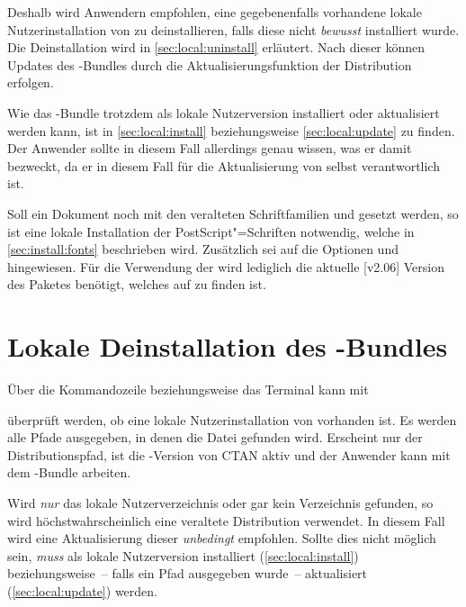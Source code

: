 Deshalb wird Anwendern empfohlen, eine gegebenenfalls vorhandene lokale 
Nutzerinstallation von \TUDScript zu deinstallieren, falls diese nicht 
\emph{bewusst} installiert wurde. Die Deinstallation wird in 
\autoref{sec:local:uninstall} erläutert. Nach dieser können Updates des 
\TUDScript-Bundles durch die Aktualisierungsfunktion der Distribution erfolgen. 

Wie das \TUDScript-Bundle trotzdem als lokale Nutzerversion installiert oder 
aktualisiert werden kann, ist in \autoref{sec:local:install} beziehungsweise 
\autoref{sec:local:update} zu finden. Der Anwender sollte in diesem Fall 
allerdings genau wissen, was er damit bezweckt, da er in diesem Fall für die 
Aktualisierung von \TUDScript selbst verantwortlich ist.

Soll ein Dokument noch mit den veralteten Schriftfamilien \Univers und \DIN 
gesetzt werden, so ist eine lokale Installation der PostScript"=Schriften 
notwendig, welche in \autoref{sec:install:fonts} beschrieben wird. Zusätzlich 
sei auf die Optionen  und  
hingewiesen. Für die Verwendung der \OpenSans wird lediglich die aktuelle 
[v2.06]  
Version des Paketes  benötigt, welches auf 
 zu finden ist.


\section{Lokale Deinstallation des \TUDScript-Bundles}
%
%
%
Über die Kommandozeile beziehungsweise das Terminal kann mit
%
\begin{quoting}
\end{quoting}
%
überprüft werden, ob eine lokale Nutzerinstallation von \TUDScript vorhanden 
ist. Es werden alle Pfade ausgegeben, in denen die Datei  
gefunden wird. Erscheint nur der Distributionspfad, ist die \TUDScript-Version 
von CTAN aktiv und der Anwender kann mit dem \TUDScript-Bundle arbeiten.

Wird \emph{nur} das lokale Nutzerverzeichnis oder gar kein Verzeichnis 
gefunden, so wird höchstwahrscheinlich eine veraltete Distribution 
verwendet. In diesem Fall wird eine Aktualisierung dieser \emph{unbedingt} 
empfohlen. Sollte dies nicht möglich sein, \emph{muss} \TUDScript als lokale 
Nutzerversion installiert (\autoref{sec:local:install}) beziehungsweise~-- 
falls ein Pfad ausgegeben wurde~-- aktualisiert (\autoref{sec:local:update}) 
werden.

